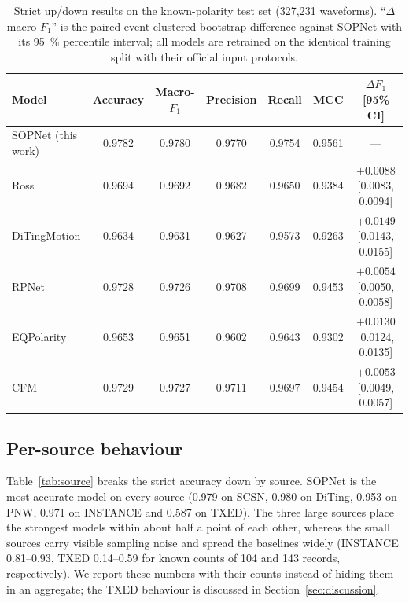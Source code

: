 \documentclass[11pt]{article}
\begin{document}
\begin{table}[t]
  \centering
  \caption{Strict up/down results on the known-polarity test set
  (327{,}231 waveforms). ``$\Delta$ macro-$F_1$'' is the paired
  event-clustered bootstrap difference against SOPNet with its
  \SI{95}{\percent} percentile interval; all models are retrained on the
  identical training split with their official input protocols.}
  \label{tab:main}
  \small
  \begin{tabular}{lcccccc}
    \toprule
    Model & Accuracy & Macro-$F_1$ & Precision & Recall & MCC & $\Delta F_1$ [95\% CI] \\
    \midrule
    SOPNet (this work) & 0.9782 & 0.9780 & 0.9770 & 0.9754 & 0.9561 & --- \\
    Ross               & 0.9694 & 0.9692 & 0.9682 & 0.9650 & 0.9384 & $+0.0088$ [0.0083, 0.0094] \\
    DiTingMotion       & 0.9634 & 0.9631 & 0.9627 & 0.9573 & 0.9263 & $+0.0149$ [0.0143, 0.0155] \\
    RPNet              & 0.9728 & 0.9726 & 0.9708 & 0.9699 & 0.9453 & $+0.0054$ [0.0050, 0.0058] \\
    EQPolarity         & 0.9653 & 0.9651 & 0.9602 & 0.9643 & 0.9302 & $+0.0130$ [0.0124, 0.0135] \\
    CFM                & 0.9729 & 0.9727 & 0.9711 & 0.9697 & 0.9454 & $+0.0053$ [0.0049, 0.0057] \\
    \bottomrule
  \end{tabular}
\end{table}

\subsection{Per-source behaviour}
\label{sec:per_source}

Table~\ref{tab:source} breaks the strict accuracy down by source. SOPNet is
the most accurate model on every source (0.979 on SCSN, 0.980 on DiTing,
0.953 on PNW, 0.971 on INSTANCE and 0.587 on TXED). The three large sources
place the strongest models within about half a point of each other, whereas
the small sources carry visible sampling noise and spread the baselines
widely (INSTANCE 0.81--0.93, TXED 0.14--0.59 for known counts of 104 and 143
records, respectively). We report these numbers with their counts instead of
hiding them in an aggregate; the TXED behaviour is discussed in
Section~\ref{sec:discussion}.
\end{document}
